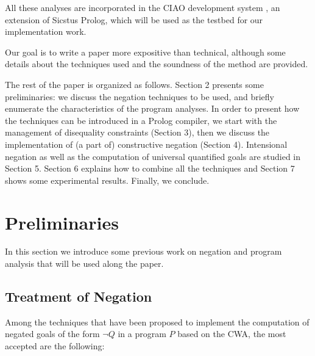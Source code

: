 \documentclass[]{llncs}
\begin{document}
All these analyses are incorporated in the CIAO development system
\cite{ciao-novascience}, an extension of Sicstus Prolog, which
will be used as the testbed for our implementation work.

Our goal is to write a paper more expositive than technical, although
some details about the techniques used and the soundness of the method
are provided.

The rest of the paper is organized as follows. Section 2 presents some
preliminaries: we discuss the negation techniques to be used, and
briefly enumerate the characteristics of the program analyses. In
order to present how the techniques can be introduced in a Prolog
compiler, we start with the management of disequality constraints
(Section 3), then we discuss the implementation of (a part of)
constructive negation (Section 4).  Intensional negation as well as
the computation of universal quantified goals are studied in Section
5.  Section 6 explains how to combine all the techniques and Section 7
shows some experimental results. Finally, we conclude.



\vspace{-7pt}
\section{Preliminaries}
\vspace{-7pt}
In this section we introduce some previous work on negation
and program analysis that will be used along the paper.

\subsection{Treatment of Negation}

Among the techniques that have been proposed to implement the
computation of negated goals of the form $\neg Q$ in a program $P$
based on the CWA, the most accepted are the following:
\end{document}
